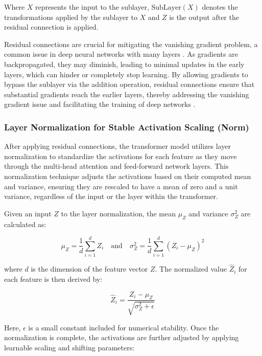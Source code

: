 Where \(X\) represents the input to the sublayer, \(\text{SubLayer}(X)\) denotes the transformations applied by the sublayer to \(X\) and \(Z\) is the output after the residual connection is applied.

Residual connections are crucial for mitigating the vanishing gradient problem, a common issue in deep neural networks with many layers \cite{pascanu2013difficulty}. As gradients are backpropagated, they may diminish, leading to minimal updates in the early layers, which can hinder or completely stop learning. By allowing gradients to bypass the sublayer via the addition operation, residual connections ensure that substantial gradients reach the earlier layers, thereby addressing the vanishing gradient issue and facilitating the training of deep networks \cite{vaswani2017attention}.

\subsubsection{Layer Normalization for Stable Activation Scaling (Norm)}

After applying residual connections, the transformer model utilizes layer normalization to standardize the activations for each feature as they move through the multi-head attention and feed-forward network layers. This normalization technique adjusts the activations based on their computed mean and variance, ensuring they are rescaled to have a mean of zero and a unit variance, regardless of the input or the layer within the transformer.

Given an input \( Z \) to the layer normalization, the mean \( \mu_Z \) and variance \( \sigma_Z^2 \) are calculated as:

\begin{equation}
\mu_Z = \frac{1}{d} \sum_{i=1}^{d} Z_i \quad \text{and} \quad \sigma_Z^2 = \frac{1}{d} \sum_{i=1}^{d} (Z_i - \mu_Z)^2
\end{equation}

where \( d \) is the dimension of the feature vector \( Z \). The normalized value \( \hat{Z}_i \) for each feature is then derived by:

\begin{equation}
\hat{Z}_i = \frac{Z_i - \mu_Z}{\sqrt{\sigma_Z^2 + \epsilon}}
\end{equation}

Here, \( \epsilon \) is a small constant included for numerical stability. Once the normalization is complete, the activations are further adjusted by applying learnable scaling and shifting parameters:


